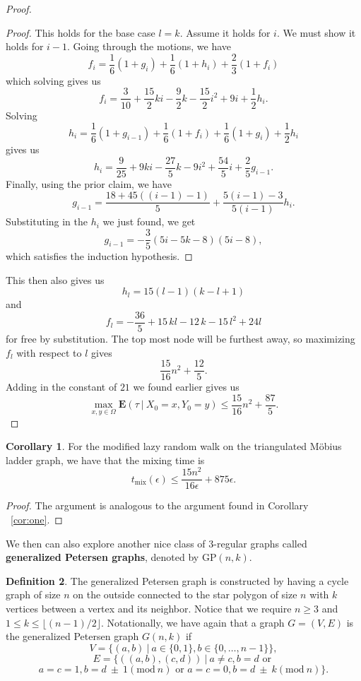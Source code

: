 \documentclass[10pt,a4paper]{amsart}
\theoremstyle{definition}
\newtheorem{definition}{Definition}
\numberwithin{definition}{section}
\newtheorem{corollary}[definition]{Corollary}
\newcommand{\Mod}[1]{(\mathrm{mod}\ #1)}
\begin{document}
\begin{proof}
\begin{proof}
This holds for the base case $l = k$. Assume it holds for $i$. We must show it holds for $i-1$. Going through the motions, we have
\[f_i = \frac{1}{6}(1+g_i) + \frac{1}{6}(1+h_i) + \frac{2}{3}(1+f_i) \]
which solving gives us 
\[ f_i = \frac{3}{10}+\frac{15}{2}ki-\frac{9}{2}k-\frac{15}{2}{i}^{2}+9i+\frac{1}{2}h_i. \]
Solving 
\[h_i = \frac{1}{6}(1 + g_{i-1}) + \frac{1}{6}(1 + f_{i}) + \frac{1}{6}(1+g_i) + \frac{1}{2}h_i \]
gives us 
\[h_i = \frac{9}{25} + 9ki -\frac{27}{5}k - 9i^2 + \frac{54}{5}i + \frac{2}{5}g_{i-1}. \]
Finally, using the prior claim, we have
\[g_{i-1} = \frac{18+45\left((i-1)-1\right)}{5} + \frac{5(i-1)-3}{5(i-1)}h_i. \]
Substituting in the $h_i$ we just found, we get 
\[ g_{i-1} = -\frac{3}{5}(5i-5k-8)(5i-8), \]
which satisfies the induction hypothesis.
\end{proof}

This then also gives us 
\[h_l = 15(l-1)(k-l+1)\]
and
\[f_l =  -\frac{36}{5}+15\,kl-12\,k-15\,{l}^{2}+24l\]
for free by substitution. The top most node will be furthest away, so maximizing $f_l$ with respect to $l$ gives
\[ \frac{15}{16}n^2 + \frac{12}{5}. \]
Adding in the constant of $21$ we found earlier gives us 
\[ \max_{x,y \in \Omega} \mathbf{E}(\tau \ | \ X_0 = x, Y_0 =y) \leq \frac{15}{16}n^2 + \frac{87}{5}. \]
\end{proof}


\begin{corollary}
For the modified lazy random walk on the triangulated M\"{o}bius ladder graph, we have that the mixing time is 
\[ t_{\text{mix}}(\epsilon) \leq \frac{15 n^2}{16 \epsilon} + {87}{5\epsilon}.\]
\end{corollary}

\begin{proof}
The argument is analogous to the argument found in Corollary ~\ref{cor:one}.
\end{proof}

We then can also explore another nice class of $3$-regular graphs called \textbf{generalized Petersen graphs}, denoted by $\text{GP}(n,k)$. 

\begin{definition}
The generalized Petersen graph is constructed by having a cycle graph of size $n$ on the outside connected to the star polygon of size $n$ with $k$ vertices between a vertex and its neighbor. Notice that we require $n \geq 3$ and $ 1 \leq k \leq \lfloor (n-1)/2 \rfloor$. Notationally, we have again that a graph $G = (V,E)$ is the generalized Petersen graph $G(n,k)$ if
\[ V = \{(a,b) \ | \ a \in \{0,1\}, b \in \{0, \ldots, n-1\} \},\]
\[ E = \{\left((a,b),(c,d)\right) \ | \ a \neq c, b = d \text{ or } \]
\[ a = c = 1, b = d \ \pm \ 1 \Mod{n} \text{ or } a = c = 0, b = d \ \pm \ k \Mod{n}  \}.  \]
\end{definition}
\end{document}
